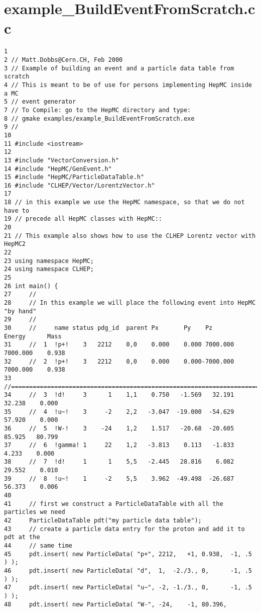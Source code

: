 \section{example\_\-Build\-Event\-From\-Scratch.cc}


\begin{DocInclude}\begin{verbatim}1 
2 // Matt.Dobbs@Cern.CH, Feb 2000
3 // Example of building an event and a particle data table from scratch
4 // This is meant to be of use for persons implementing HepMC inside a MC 
5 // event generator
7 // To Compile: go to the HepMC directory and type:
8 // gmake examples/example_BuildEventFromScratch.exe
9 //
10 
11 #include <iostream>
12 
13 #include "VectorConversion.h"
14 #include "HepMC/GenEvent.h"
15 #include "HepMC/ParticleDataTable.h"
16 #include "CLHEP/Vector/LorentzVector.h"
17 
18 // in this example we use the HepMC namespace, so that we do not have to 
19 // precede all HepMC classes with HepMC::
20 
21 // This example also shows how to use the CLHEP Lorentz vector with HepMC2
22 
23 using namespace HepMC;
24 using namespace CLHEP;
25 
26 int main() {
27     //
28     // In this example we will place the following event into HepMC "by hand"
29     //
30     //     name status pdg_id  parent Px       Py    Pz       Energy      Mass
31     //  1  !p+!    3   2212    0,0    0.000    0.000 7000.000 7000.000    0.938
32     //  2  !p+!    3   2212    0,0    0.000    0.000-7000.000 7000.000    0.938
33     //=========================================================================
34     //  3  !d!     3      1    1,1    0.750   -1.569   32.191   32.238    0.000
35     //  4  !u~!    3     -2    2,2   -3.047  -19.000  -54.629   57.920    0.000
36     //  5  !W-!    3    -24    1,2    1.517   -20.68  -20.605   85.925   80.799
37     //  6  !gamma! 1     22    1,2   -3.813    0.113   -1.833    4.233    0.000
38     //  7  !d!     1      1    5,5   -2.445   28.816    6.082   29.552    0.010
39     //  8  !u~!    1     -2    5,5    3.962  -49.498  -26.687   56.373    0.006
40 
41     // first we construct a ParticleDataTable with all the particles we need
42     ParticleDataTable pdt("my particle data table");
43     // create a particle data entry for the proton and add it to pdt at the
44     // same time
45     pdt.insert( new ParticleData( "p+", 2212,   +1, 0.938,  -1, .5 ) );
46     pdt.insert( new ParticleData( "d",  1,  -2./3., 0,      -1, .5 ) );
47     pdt.insert( new ParticleData( "u~", -2, -1./3., 0,      -1, .5 ) );
48     pdt.insert( new ParticleData( "W-", -24,    -1, 80.396,

\end{verbatim}
\end{DocInclude}
